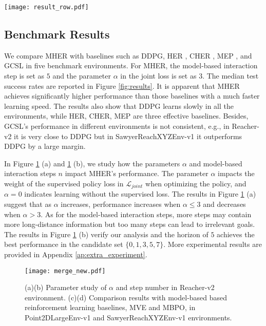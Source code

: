 \documentclass{article}
\begin{document}
\begin{figure*}[tb]
    \centering
    \texttt{[image: result\_row.pdf]}
    \caption{Median test success rate (line) with interquartile range (shaded area) on Point2D and Mujoco environments acorss 10 random seeds.}
    \label{fig:results}
\end{figure*}

\subsection{Benchmark Results}
We compare MHER with baselines such as DDPG, HER \cite{andrychowicz2017hindsight}, CHER \cite{fang2019curriculum}, MEP \cite{zhao2019maximum}, and GCSL \cite{ghosh2021learning} in five benchmark environments. For MHER, the model-based interaction step is set as $5$ and the parameter $\alpha$ in the joint loss is set as $3$. The median test success rates are reported in Figure \ref{fig:results}. It is apparent that MHER achieves significantly higher performance than those baselines with a much faster learning speed. The results also show that DDPG learns slowly in all the environments, while HER, CHER, MEP are three effective baselines. Besides, GCSL's performance in different environments is not consistent, e.g., in Reacher-v2 it is very close to DDPG but in SawyerReachXYZEnv-v1 it outperforms DDPG by a large margin. 

In Figure \ref{fig:merge} (a) and \ref{fig:merge} (b), we study how the parameters $\alpha$ and model-based interaction steps $n$ impact MHER's performance. The parameter $\alpha$ impacts the weight of the supervised policy loss in $\mathcal{L}_{joint}$ when optimizing the policy, and $\alpha = 0$ indicates learning without the supervised loss. The results in Figure \ref{fig:merge} (a) suggest that as $\alpha$ increases, performance increases when $\alpha \leq 3$ and decreases when $\alpha > 3$. As for the model-based interaction steps, more steps may contain more long-distance information but too many steps can lead to irrelevant goals. The results in Figure \ref{fig:merge} (b) verify our analysis and the horizon of $5$ achieves the best performance in the candidate set $\{0,1,3,5,7\}$. More experimental results are provided in Appendix \ref{ap:extra_experiment}.

\begin{figure}[t]
    \centering
    \texttt{[image: merge\_new.pdf]}
    \caption{(a)(b) Parameter study of $\alpha$ and step number in Reacher-v2 environment. (c)(d) Comparison results with model-based based reinforcement learning baselines, MVE and MBPO, in Point2DLargeEnv-v1 and SawyerReachXYZEnv-v1 environments.}
    \label{fig:merge}
\end{figure}
\end{document}
